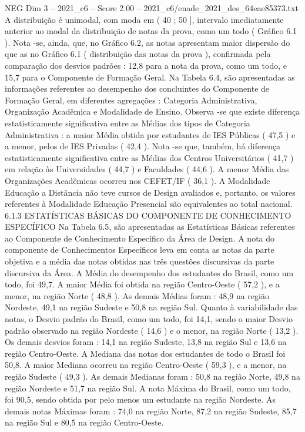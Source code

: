\begin{textsample}{NEG Dim 3 – 2021\_c6 – Score 2.00 – 2021\_c6/enade\_2021\_des\_64eae85373.txt}
A distribuição é unimodal, com moda em ( 40 ; 50 ], intervalo imediatamente anterior ao modal da distribuição de notas da prova, como um todo ( Gráfico 6.1 ).
Nota -se, ainda, que, no Gráfico 6.2, as notas apresentam maior dispersão do que as no Gráfico 6.1 ( distribuição das notas da prova ), confirmada pela comparação dos desvios padrões : 12,8 para a nota da prova, como um todo, e 15,7 para o Componente de Formação Geral.
Na Tabela 6.4, são apresentadas as informações referentes ao desempenho dos concluintes do Componente de Formação Geral, em diferentes agregações : Categoria Administrativa, Organização Acadêmica e Modalidade de Ensino.
Observa -se que existe diferença estatisticamente significativa entre as Médias dos tipos de Categoria Administrativa : a maior Média obtida por estudantes de IES Públicas ( 47,5 ) e a menor, pelos de IES Privadas ( 42,4 ).
Nota -se que, também, há diferença estatisticamente significativa entre as Médias dos Centros Universitários ( 41,7 ) em relação às Universidades ( 44,7 ) e Faculdades ( 44,6 ).
A menor Média das Organizações Acadêmicas ocorreu nos CEFET/IF ( 36,1 ).
A Modalidade Educação a Distância não teve cursos de Design avaliados e, portanto, os valores referentes à Modalidade Educação Presencial são equivalentes ao total nacional. 6.1.3 ESTATÍSTICAS BÁSICAS DO COMPONENTE DE CONHECIMENTO ESPECÍFICO Na Tabela 6.5, são apresentadas as Estatísticas Básicas referentes ao Componente de Conhecimento Específico da Área de Design.
A nota do componente de Conhecimentos Específicos leva em conta as notas da parte objetiva e a média das notas obtidas nas três questões discursivas da parte discursiva da Área.
A Média do desempenho dos estudantes do Brasil, como um todo, foi 49,7.
A maior Média foi obtida na região Centro-Oeste ( 57,2 ), e a menor, na região Norte ( 48,8 ).
As demais Médias foram : 48,9 na região Nordeste, 49,1 na região Sudeste e 50,8 na região Sul.
Quanto à variabilidade das notas, o Desvio padrão do Brasil, como um todo, foi 14,1, sendo o maior Desvio padrão observado na região Nordeste ( 14,6 ) e o menor, na região Norte ( 13,2 ).
Os demais desvios foram : 14,1 na região Sudeste, 13,8 na região Sul e 13,6 na região Centro-Oeste.
A Mediana das notas dos estudantes de todo o Brasil foi 50,8.
A maior Mediana ocorreu na região Centro-Oeste ( 59,3 ), e a menor, na região Sudeste ( 49,3 ).
As demais Medianas foram : 50,8 na região Norte, 49,8 na região Nordeste e 51,7 na região Sul.
A nota Máxima do Brasil, como um todo, foi 90,5, sendo obtida por pelo menos um estudante na região Nordeste.
As demais notas Máximas foram : 74,0 na região Norte, 87,2 na região Sudeste, 85,7 na região Sul e 80,5 na região Centro-Oeste.

\end{textsample}

